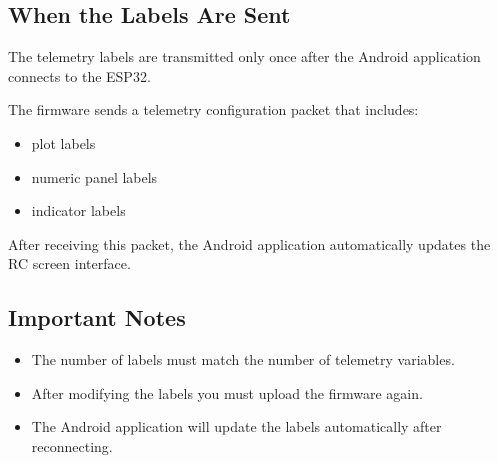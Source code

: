 \subsection{When the Labels Are Sent}

The telemetry labels are transmitted only once after the Android
application connects to the ESP32.

The firmware sends a telemetry configuration packet that includes:

\begin{itemize}
	\item plot labels
	\item numeric panel labels
	\item indicator labels
\end{itemize}

After receiving this packet, the Android application automatically
updates the RC screen interface.

\subsection{Important Notes}

\begin{itemize}
	\item The number of labels must match the number of telemetry variables.
	\item After modifying the labels you must upload the firmware again.
	\item The Android application will update the labels automatically after reconnecting.
\end{itemize}


